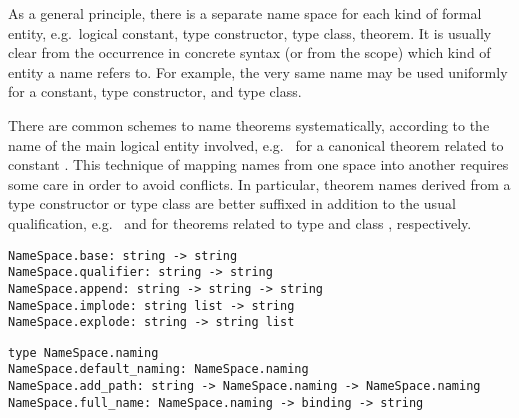 \begin{isabellebody}
\begin{isamarkuptext}
  \medskip As a general principle, there is a separate name space for
  each kind of formal entity, e.g.\ logical constant, type
  constructor, type class, theorem.  It is usually clear from the
  occurrence in concrete syntax (or from the scope) which kind of
  entity a name refers to.  For example, the very same name  may be used uniformly for a constant, type constructor, and
  type class.

  There are common schemes to name theorems systematically, according
  to the name of the main logical entity involved, e.g.\  for a canonical theorem related to constant .
  This technique of mapping names from one space into another requires
  some care in order to avoid conflicts.  In particular, theorem names
  derived from a type constructor or type class are better suffixed in
  addition to the usual qualification, e.g.\ 
  and  for theorems related to type 
  and class , respectively.%
\end{isamarkuptext}%
\isamarkuptrue%
%
\isadelimmlref
%
\endisadelimmlref
%
\isatagmlref
%
\begin{isamarkuptext}%
\begin{mldecls}
  \verb|NameSpace.base: string -> string| \\
  \verb|NameSpace.qualifier: string -> string| \\
  \verb|NameSpace.append: string -> string -> string| \\
  \verb|NameSpace.implode: string list -> string| \\
  \verb|NameSpace.explode: string -> string list| \\
  \end{mldecls}
  \begin{mldecls}
  \verb|type NameSpace.naming| \\
  \verb|NameSpace.default_naming: NameSpace.naming| \\
  \verb|NameSpace.add_path: string -> NameSpace.naming -> NameSpace.naming| \\
  \verb|NameSpace.full_name: NameSpace.naming -> binding -> string| \\
  \end{mldecls}

\end{isamarkuptext}
\end{isabellebody}
